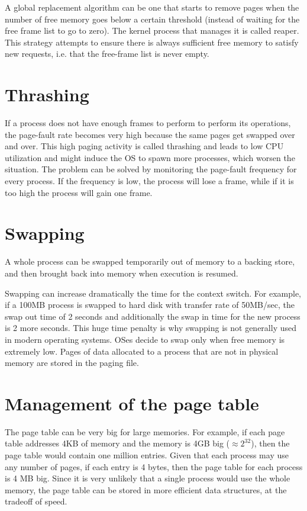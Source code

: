 A global replacement algorithm can be one that starts to remove pages when the number of free memory goes below a certain threshold (instead of waiting for the free frame list to go to zero). The kernel process that manages it is called reaper. This strategy attempts to ensure there is always sufficient free memory to satisfy new requests, i.e. that the free-frame list is never empty.

\section{Thrashing}
If a process does not have enough frames to perform to perform its operations, the page-fault rate becomes very high because the same pages get swapped over and over. This high paging activity is called thrashing and leads to low CPU utilization and might induce the OS to spawn more processes, which worsen the situation. The problem can be solved by monitoring the page-fault frequency for every process. If the frequency is low, the process will lose a frame, while if it is too high the process will gain one frame.

\section{Swapping}
A whole process can be swapped temporarily out of memory to a backing store, and then brought back into memory when execution is resumed.

Swapping can increase dramatically the time for the context switch. For example, if a 100MB process is swapped to hard disk with transfer rate of 50MB/sec, the swap out time of 2 seconds and additionally the swap in time for the new process is 2 more seconds. This huge time penalty is why swapping is not generally used in modern operating systems. OSes decide to swap only when free memory is extremely low. Pages of data allocated to a process that are not in physical memory are stored in the paging file.

\section{Management of the page table}
The page table can be very big for large memories. For example, if each page table addresses 4KB of memory and the memory is 4GB big ($\approx 2^32$), then the page table would contain one million entries. Given that each process may use any number of pages, if each entry is 4 bytes, then the page table for each process is 4 MB big. Since it is very unlikely that a single process would use the whole memory, the page table can be stored in more efficient data structures, at the tradeoff of speed.

